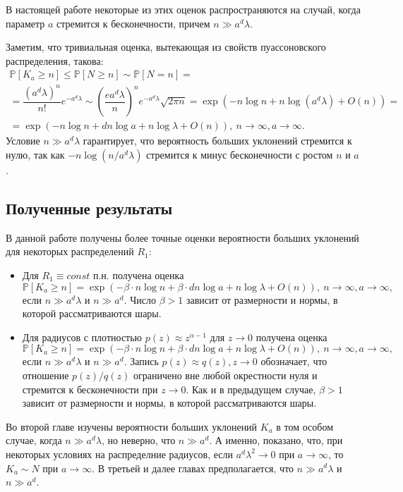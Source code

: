 \documentclass[12pt]{article}
\theoremstyle{plain}
\theoremstyle{definition}
\theoremstyle{remark}
\def\geq{\geqslant}
\def\leq{\leqslant}
\newcommand{\PP}{\mathbb{P}}
\begin{document}
В настоящей работе некоторые из этих оценок распространяются на случай, когда параметр $a$ стремится к бесконечности, причем $n \gg a^d\lambda$.

Заметим, что тривиальная оценка, вытекающая из свойств пуассоновского распределения, такова:
\begin{multline*}
    \PP[K_a \geq n] \leq \PP[N\geq n] \sim \PP[N = n] =\\
    = \dfrac{(a^d\lambda)^n}{n!}e^{-a^d\lambda} \sim \left(\dfrac{ea^d\lambda}{n}\right)^ne^{-a^d\lambda}\sqrt{2\pi n} = 
    \exp(-n\log n + n\log (a^d\lambda) + O(n) ) = \\
    =\exp(-n\log n + dn\log a + n\log\lambda + 
    O(n)), \ n\to \infty, a \to\infty.
\end{multline*}{}
Условие $n\gg a^d\lambda$ гарантирует, что вероятность больших уклонений стремится к нулю, так как $-n\log(n/a^d\lambda)$ стремится к минус бесконечности с ростом $n$ и $a$. 

\subsection{Полученные результаты}
В данной работе получены более точные оценки вероятности больших уклонений для некоторых распределений $R_1$:
\begin{itemize}
    \item Для $R_1 \equiv const$ п.н. получена оценка $$\PP[K_a \geq n] = \exp(-\beta\cdot n\log n + \beta\cdot dn\log a + n\log\lambda + O(n)), \ n\to \infty, a \to\infty,$$
    если $n\gg a^d\lambda$ и $n\gg a^d$.
    Число $\beta > 1$ зависит от размерности и нормы, в которой рассматриваются шары.
    \item Для радиусов с плотностью $p(z) \approx z^{\alpha -1}$ для $z\to 0$ получена оценка $$\PP[K_a \geq n] = \exp(-\beta\cdot n\log n + \beta\cdot dn\log a + n\log\lambda + O(n)), \ n\to \infty, a \to\infty,$$
    если $n\gg a^d\lambda$ и $n\gg a^d$. Запись $p(z) \approx q(z), z\to 0$ обозначает, что отношение  $p(z)/q(z)$ ограничено вне любой окрестности нуля и стремится к бесконечности при $z\to 0$. Как и в предыдущем случае, $\beta > 1$ зависит от размерности и нормы, в которой рассматриваются шары.
\end{itemize}

Во второй главе изучены вероятности больших уклонений $K_a$ в том особом случае, когда $n \gg a^d\lambda$, но неверно, что $n\gg a^d$. А именно, показано, что, при некоторых условиях на распределние радиусов, если $a^d\lambda^2 \to 0$ при $a\to\infty$, то $K_a \sim N$ при $a\to \infty$.
В третьей и далее главах предполагается, что  $n \gg a^d\lambda$ и $n\gg a^d$.
\end{document}
